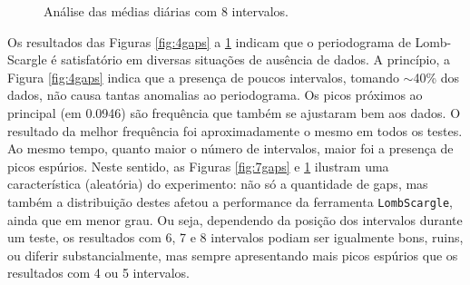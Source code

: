 \begin{figure}[ht!]
\vspace{-8mm}	
	\caption{Análise das médias diárias com 8 intervalos.}
	\vspace{1mm}	
	\begin{center}
	\end{center}
	\vspace{-1mm}	
	\label{fig:8gaps}
\end{figure}

\clearpage{}
\vspace*{-60px}	
Os resultados das Figuras \ref{fig:4gaps} a \ref{fig:8gaps} indicam que o periodograma de Lomb-Scargle é satisfatório em diversas situações de ausência de dados. A princípio, a Figura \ref{fig:4gaps} indica que a presença de poucos intervalos, tomando $\sim$40\% dos dados, não causa tantas anomalias ao periodograma. Os picos próximos ao principal (em 0.0946) são frequência que também se ajustaram bem aos dados. O resultado da melhor frequência foi aproximadamente o mesmo em todos os testes. Ao mesmo tempo, quanto maior o número de intervalos, maior foi a presença de picos espúrios. Neste sentido, as Figuras \ref{fig:7gaps} e \ref{fig:8gaps} ilustram uma característica (aleatória) do experimento: não só a quantidade de gaps, mas também a distribuição destes afetou a performance da ferramenta \texttt{LombScargle}, ainda que em menor grau. Ou seja, dependendo da posição dos intervalos durante um teste, os resultados com 6, 7 e 8 intervalos podiam ser igualmente bons, ruins, ou diferir substancialmente, mas sempre apresentando mais picos espúrios que os resultados com 4 ou 5 intervalos.

